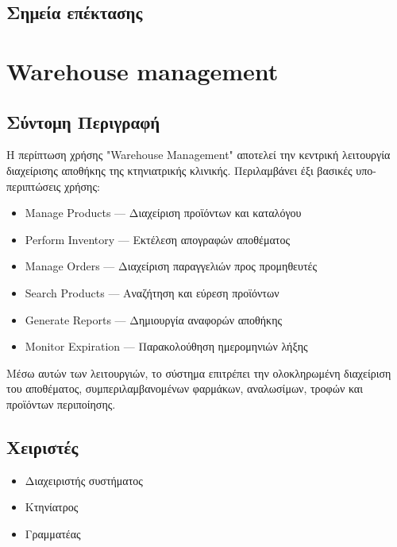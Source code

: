 \documentclass[12pt,a4paper,twoside]{book}
\begin{document}
\subsection{Σημεία επέκτασης}

\section{Warehouse management}

\subsection{Σύντομη Περιγραφή}
Η περίπτωση χρήσης "Warehouse Management" αποτελεί την κεντρική λειτουργία διαχείρισης αποθήκης της κτηνιατρικής κλινικής. Περιλαμβάνει έξι βασικές υπο-περιπτώσεις χρήσης: %
\begin{itemize}
  \item Manage Products --- Διαχείριση προϊόντων και καταλόγου
  \item Perform Inventory --- Εκτέλεση απογραφών αποθέματος
  \item Manage Orders --- Διαχείριση παραγγελιών προς προμηθευτές
  \item Search Products --- Αναζήτηση και εύρεση προϊόντων
  \item Generate Reports --- Δημιουργία αναφορών αποθήκης
  \item Monitor Expiration --- Παρακολούθηση ημερομηνιών λήξης
\end{itemize}

Μέσω αυτών των λειτουργιών, το σύστημα επιτρέπει την ολοκληρωμένη διαχείριση του αποθέματος, συμπεριλαμβανομένων φαρμάκων, αναλωσίμων, τροφών και προϊόντων περιποίησης.

\subsection{Χειριστές}
\begin{itemize}
  \item Διαχειριστής συστήματος
  \item Κτηνίατρος
  \item Γραμματέας
\end{itemize}
\end{document}
